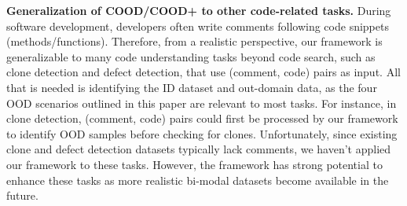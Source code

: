 \textbf{Generalization of COOD/COOD+ to other code-related tasks.} During software development, developers often write comments following code snippets (methods/functions). Therefore, from a realistic perspective, our framework is generalizable to many code understanding tasks beyond code search, such as clone detection and defect detection, that use (comment, code) pairs as input. All that is needed is identifying the ID dataset and out-domain data, as the four OOD scenarios outlined in this paper are relevant to most tasks. For instance, in clone detection, (comment, code) pairs could first be processed by our framework to identify OOD samples before checking for clones. Unfortunately, since existing clone and defect detection datasets typically lack comments, we haven't applied our framework to these tasks. However, the framework has strong potential to enhance these tasks as more realistic bi-modal datasets become available in the future.




